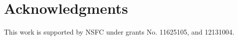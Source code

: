 \section*{Acknowledgments}

This work is supported by NSFC under grants No. 11625105, and 12131004.
